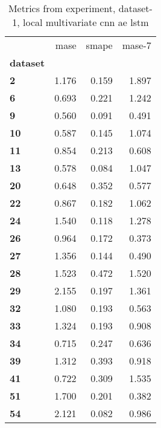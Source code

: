 \begin{table}[h]
\centering
\caption{Metrics from experiment, dataset-1, local multivariate cnn ae lstm}
\label{table:local-multivariate-cnn-ae-lstm-dataset-1}
\begin{tabular}{lrrr}
\toprule
{} &   mase &  smape &  mase-7 \\
\textbf{dataset} &        &        &         \\
\midrule
\textbf{2      } &  1.176 &  0.159 &   1.897 \\
\textbf{6      } &  0.693 &  0.221 &   1.242 \\
\textbf{9      } &  0.560 &  0.091 &   0.491 \\
\textbf{10     } &  0.587 &  0.145 &   1.074 \\
\textbf{11     } &  0.854 &  0.213 &   0.608 \\
\textbf{13     } &  0.578 &  0.084 &   1.047 \\
\textbf{20     } &  0.648 &  0.352 &   0.577 \\
\textbf{22     } &  0.867 &  0.182 &   1.062 \\
\textbf{24     } &  1.540 &  0.118 &   1.278 \\
\textbf{26     } &  0.964 &  0.172 &   0.373 \\
\textbf{27     } &  1.356 &  0.144 &   0.490 \\
\textbf{28     } &  1.523 &  0.472 &   1.520 \\
\textbf{29     } &  2.155 &  0.197 &   1.361 \\
\textbf{32     } &  1.080 &  0.193 &   0.563 \\
\textbf{33     } &  1.324 &  0.193 &   0.908 \\
\textbf{34     } &  0.715 &  0.247 &   0.636 \\
\textbf{39     } &  1.312 &  0.393 &   0.918 \\
\textbf{41     } &  0.722 &  0.309 &   1.535 \\
\textbf{51     } &  1.700 &  0.201 &   0.382 \\
\textbf{54     } &  2.121 &  0.082 &   0.986 \\
\bottomrule
\end{tabular}
\end{table}
